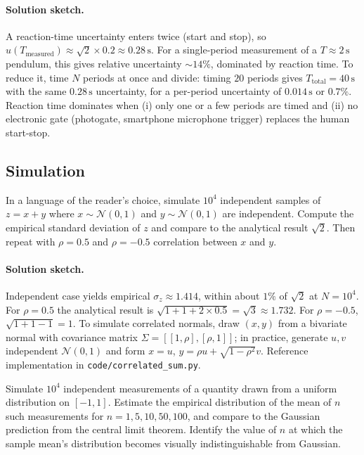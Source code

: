 \paragraph{Solution sketch.}
A reaction-time uncertainty enters twice (start and stop), so
$u(T_{\text{measured}}) \approx \sqrt{2} \times 0.2 \approx
0.28 \,\si{\second}$. For a single-period measurement of a
$T \approx 2 \,\si{\second}$ pendulum, this gives relative
uncertainty $\sim 14\%$, dominated by reaction time. To reduce it,
time $N$ periods at once and divide: timing $20$ periods gives
$T_{\text{total}} = 40 \,\si{\second}$ with the same
$0.28 \,\si{\second}$ uncertainty, for a per-period uncertainty
of $0.014 \,\si{\second}$ or $0.7\%$. Reaction time dominates
when (i) only one or a few periods are timed and (ii) no
electronic gate (photogate, smartphone microphone trigger)
replaces the human start-stop.

\subsection*{Simulation}

\begin{exercise}
In a language of the reader's choice, simulate $10^{4}$ independent
samples of $z = x + y$ where $x \sim \mathcal{N}(0, 1)$ and
$y \sim \mathcal{N}(0, 1)$ are independent. Compute the empirical
standard deviation of $z$ and compare to the analytical result
$\sqrt{2}$. Then repeat with $\rho = 0.5$ and $\rho = -0.5$
correlation between $x$ and $y$.
\end{exercise}

\paragraph{Solution sketch.}
Independent case yields empirical $\sigma_{z} \approx 1.414$,
within about $1\%$ of $\sqrt{2}$ at $N = 10^{4}$. For $\rho =
0.5$ the analytical result is $\sqrt{1 + 1 + 2 \times 0.5}
= \sqrt{3} \approx 1.732$. For $\rho = -0.5$, $\sqrt{1 + 1 - 1}
= 1$. To simulate correlated normals, draw $(x, y)$ from a
bivariate normal with covariance matrix $\Sigma = [[1, \rho],
[\rho, 1]]$; in practice, generate $u, v$ independent
$\mathcal{N}(0,1)$ and form $x = u$, $y = \rho u + \sqrt{1 -
\rho^{2}} v$. Reference implementation in
\texttt{code/correlated\_sum.py}.

\begin{exercise}
Simulate $10^{4}$ independent measurements of a quantity drawn from
a uniform distribution on $[-1, 1]$. Estimate the empirical
distribution of the mean of $n$ such measurements for $n = 1, 5,
10, 50, 100$, and compare to the Gaussian prediction from the
central limit theorem. Identify the value of $n$ at which the
sample mean's distribution becomes visually indistinguishable from
Gaussian.
\end{exercise}

